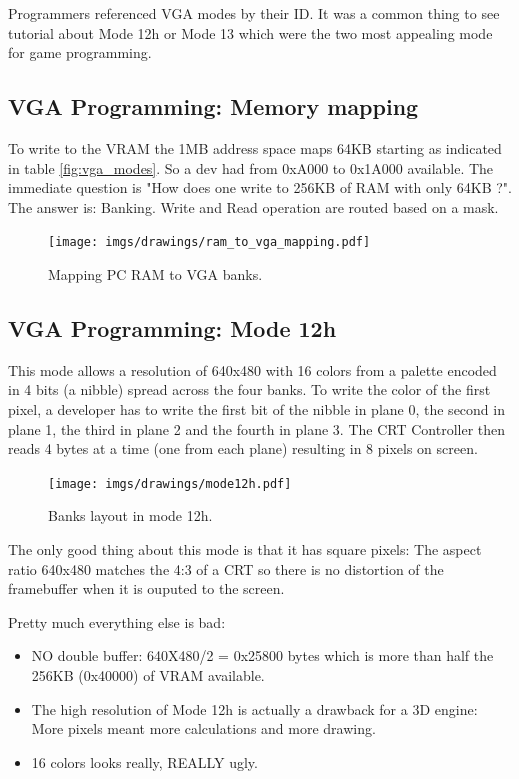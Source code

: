 \documentclass[book.tex]{subfiles}
\begin{document}
 Programmers referenced VGA modes by their ID. It was a common thing to see tutorial about Mode 12h or Mode 13 which were the two most appealing mode for game programming.


 \subsection{VGA Programming: Memory mapping}
To write to the VRAM the 1MB address space maps 64KB starting as indicated in table \ref{fig:vga_modes}. So a dev had from 0xA000 to 0x1A000 available. The immediate question is "How does one write to 256KB of RAM with only 64KB ?". The answer is: Banking. Write and Read operation are routed based on a mask.\\
\par
 \begin{figure}[H]
\centering
  
      \texttt{[image: imgs/drawings/ram\_to\_vga\_mapping.pdf]}
    
\caption{Mapping PC RAM to VGA banks.}
\end{figure}



 

 \subsection{VGA Programming: Mode 12h}
 This mode allows a resolution of 640x480 with 16 colors from a palette encoded in 4 bits (a nibble) spread across the four banks. To write the color of the first pixel, a developer has to write the first bit of the nibble in plane 0, the second in plane 1, the third in plane 2 and the fourth in plane 3. The CRT Controller then reads 4 bytes at a time (one from each plane) resulting in 8 pixels on screen.\\
\par
\begin{figure}[H]
\centering
 \texttt{[image: imgs/drawings/mode12h.pdf]}
\caption{Banks layout in mode 12h.}
\end{figure}
\par

The only good thing about this mode is that it has square pixels: The aspect ratio 640x480 matches the 4:3 of a CRT so there is no distortion of the framebuffer when it is ouputed to the screen.\\
\par

Pretty much everything else is bad:\\
\begin{itemize}
\item NO double buffer: 640X480/2 = 0x25800 bytes which is more than half the 256KB (0x40000) of VRAM available.
\item The high resolution of Mode 12h is actually a drawback for a 3D engine: More pixels meant more calculations and more drawing.
\item 16 colors looks really, REALLY ugly.
\end{itemize}
\end{document}
